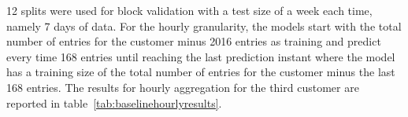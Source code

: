 12 splits were used for block validation with a test size of a week each time, namely 7 days of data.
For the hourly granularity, the models start with the total number of entries for the customer minus 2016 entries as training and predict every time 168 entries until reaching the last prediction instant where the model has a training size of the total number of entries for the customer minus the last 168 entries.
The results for hourly aggregation for the third customer are reported in table~\ref{tab:baselinehourlyresults}.



